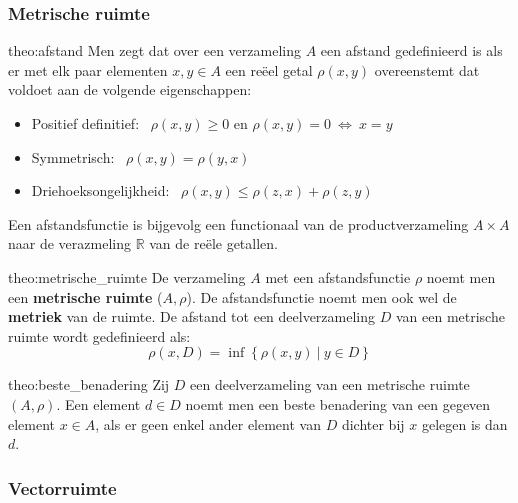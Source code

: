 \subsubsection{Metrische ruimte}

\vspace{0.5cm}

\begin{theo}[Afstand]{theo:afstand}
    Men zegt dat over een verzameling $A$ een afstand gedefinieerd is als er met elk paar elementen $x,y \in A$ een reëel getal $\rho(x,y)$ overeenstemt dat voldoet aan de volgende eigenschappen:
    \begin{itemize}
        \item Positief definitief: \ $\rho(x,y) \geq 0$ en $\rho(x,y) = 0 \ \Leftrightarrow \ x = y$
        \item Symmetrisch: \ $\rho(x,y) = \rho(y,x)$
        \item Driehoeksongelijkheid: \ $\rho(x,y) \leq \rho(z,x) + \rho(z,y)$
    \end{itemize}
    Een afstandsfunctie is bijgevolg een functionaal van de productverzameling $A \times A$ naar de verazmeling $\mathbb{R}$ van de reële getallen.
\end{theo}

\begin{theo}{theo:metrische_ruimte}
    De verzameling $A$ met een afstandsfunctie $\rho$ noemt men een \textbf{metrische ruimte} ($A,\rho$). De afstandsfunctie noemt men ook wel de \textbf{metriek} van de ruimte. De afstand tot een deelverzameling $D$ van een metrische ruimte wordt gedefinieerd als:
    \begin{equation*}
        \rho(x,D) = \inf\left\{\rho(x,y) \ | \ y \in D\right\}
    \end{equation*}
    \vspace{-0.5cm}
\end{theo}

\begin{theo}{theo:beste_benadering}
    Zij $D$ een deelverzameling van een metrische ruimte $(A,\rho)$. Een element $d \in D$ noemt men een beste benadering van een gegeven element $x\in A$, als er geen enkel ander element van $D$ dichter bij $x$ gelegen is dan $d$.
\end{theo}

\subsubsection{Vectorruimte}

